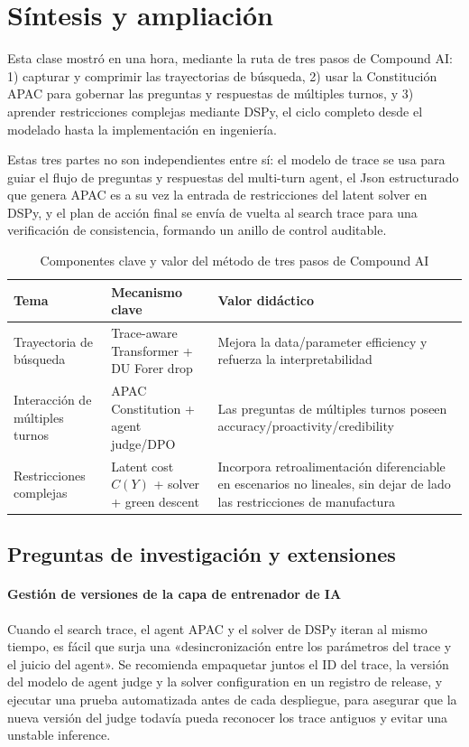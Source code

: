 \section{Síntesis y ampliación}

Esta clase mostró en una hora, mediante la ruta de tres pasos de Compound AI: 1) capturar y comprimir las trayectorias de búsqueda, 2) usar la Constitución APAC para gobernar las preguntas y respuestas de múltiples turnos, y 3) aprender restricciones complejas mediante DSPy, el ciclo completo desde el modelado hasta la implementación en ingeniería.

Estas tres partes no son independientes entre sí: el modelo de trace se usa para guiar el flujo de preguntas y respuestas del multi-turn agent, el Json estructurado que genera APAC es a su vez la entrada de restricciones del latent solver en DSPy, y el plan de acción final se envía de vuelta al search trace para una verificación de consistencia, formando un anillo de control auditable.

\begin{table}[H]
\centering
\begin{tabular}{lp{5cm}p{6cm}}
\toprule
Tema & Mecanismo clave & Valor didáctico \\
\midrule
Trayectoria de búsqueda & Trace-aware Transformer + DU Forer drop & Mejora la data/parameter efficiency y refuerza la interpretabilidad \\
Interacción de múltiples turnos & APAC Constitution + agent judge/DPO & Las preguntas de múltiples turnos poseen accuracy/proactivity/credibility \\
Restricciones complejas & Latent cost \(C(Y)\) + solver + green descent & Incorpora retroalimentación diferenciable en escenarios no lineales, sin dejar de lado las restricciones de manufactura \\
\bottomrule
\end{tabular}
\caption{Componentes clave y valor del método de tres pasos de Compound AI}
\end{table}

\subsection{Preguntas de investigación y extensiones}

\paragraph{Gestión de versiones de la capa de entrenador de IA}
Cuando el search trace, el agent APAC y el solver de DSPy iteran al mismo tiempo, es fácil que surja una «desincronización entre los parámetros del trace y el juicio del agent». Se recomienda empaquetar juntos el ID del trace, la versión del modelo de agent judge y la solver configuration en un registro de release, y ejecutar una prueba automatizada antes de cada despliegue, para asegurar que la nueva versión del judge todavía pueda reconocer los trace antiguos y evitar una unstable inference.

